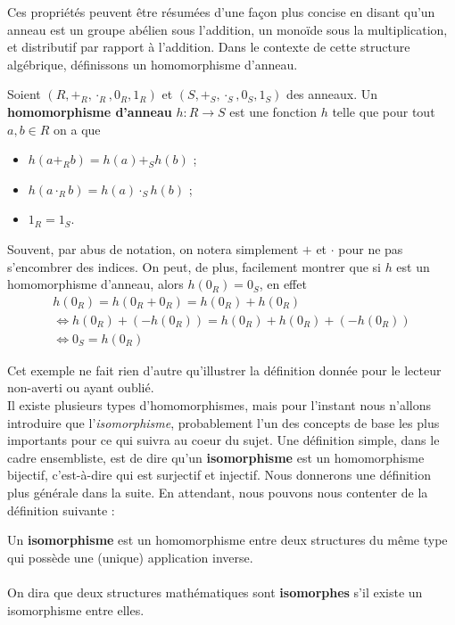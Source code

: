 \documentclass{article}
\begin{document}
\noindent
Ces propriétés peuvent être résumées d'une façon plus concise en disant qu'un anneau est un groupe abélien sous l'addition, un monoïde sous la multiplication, et distributif par rapport à l'addition. Dans le contexte de cette structure algébrique, définissons un homomorphisme d'anneau.

\begin{example}{}
    Soient $(R, +_R, \cdot_R, 0_R, 1_R)$ et $(S, +_S, \cdot_S, 0_S, 1_S)$ des anneaux. Un \textbf{homomorphisme d'anneau} $h:R\to S$ est une fonction $h$ telle que pour tout $a, b\in R$ on a que
    \begin{itemize}[label=\textbullet]
        \item $h(a+_Rb)=h(a)+_Sh(b)$ ;
        \item $h(a\cdot_R b)=h(a)\cdot_Sh(b)$ ;
        \item $1_R = 1_S$.
    \end{itemize}
    Souvent, par abus de notation, on notera simplement $+$ et $\cdot$ pour ne pas s'encombrer des indices. On peut, de plus, facilement montrer que si $h$ est un homomorphisme d'anneau, alors $h(0_R)=0_S$, en effet
    \begin{align*}
        h(0_R)=h(0_R+0_R)=h(0_R)+h(0_R)\\
        \Leftrightarrow h(0_R) + \left(-h(0_R)\right)=h(0_R)+h(0_R)+ \left(-h(0_R)\right)\\
        \Leftrightarrow 0_S=h(0_R)
    \end{align*}
\end{example}

\noindent
Cet exemple ne fait rien d'autre qu'illustrer la définition donnée pour le lecteur non-averti ou ayant oublié.\\

Il existe plusieurs types d'homomorphismes, mais pour l'instant nous n'allons introduire que l'\textit{isomorphisme}, probablement l'un des concepts de base les plus importants pour ce qui suivra au coeur du sujet. Une définition simple, dans le cadre ensembliste, est de dire qu'un \textbf{isomorphisme} est un homomorphisme bijectif, c'est-à-dire qui est surjectif et injectif. Nous donnerons une définition plus générale dans la suite. En attendant, nous pouvons nous contenter de la définition suivante :

\begin{definition}[Isomorphisme]{}
    Un \textbf{isomorphisme} est un homomorphisme entre deux structures du même type qui possède une (unique) application inverse.\\\\On dira que deux structures mathématiques sont \textbf{isomorphes} s'il existe un isomorphisme entre elles.
\end{definition}
\end{document}
